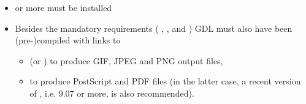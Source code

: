 \documentclass[12pt,twoside]{article}
\begin{document}
\begin{itemize}
\item \healpix \hpxversion{} or more must be installed%

\item
Besides the mandatory requirements (%
, 
, 
and 
) 
GDL must also have been (pre-)compiled with links to
\begin{itemize}
\item {}
(or ) 
to produce GIF, JPEG and PNG output files, 
\item {} to produce PostScript and PDF files (in the latter case,
a recent version of , i.e. 9.07 or more, is also recommended).
\end{itemize}




\end{itemize}
\end{document}

